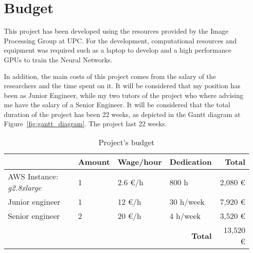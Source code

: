 \chapter{Budget}

This project has been developed using the resources provided by the Image Processing Group at UPC. For the development, computational resources and equipment was required such as a laptop to develop and a high performance GPUs to train the Neural Networks.

In addition, the main costs of this project comes from the salary of the researchers and the time spent on it. It will be considered that my position has been as Junior Engineer, while my two tutors of the project who where advising me have the salary of a Senior Engineer. It will be considered that the total duration of the project has been 22 weeks, as depicted in the Gantt diagram at Figure~\ref{fig:gantt_diagram}.
The project last 22 weeks.

\begin{table}[h]
\centering
\begin{tabular}{|l|l|l|l|r|}
\hline
 & \textbf{Amount} & \textbf{Wage/hour} & \textbf{Dedication} & \textbf{Total}  \\ [0.5ex]
\hline
AWS Instance: \textit{g2.8xlarge} & 1 & 2.6 \euro /h & 800 h & 2,080 \euro \\
\hline
Junior engineer & 1  & 12 \euro /h & 30 h/week & 7,920 \euro \\
\hline
Senior engineer & 2 & 20 \euro /h  & 4 h/week & 3,520 \euro \\
\hline
 \multicolumn{4}{|r|}{\textbf{Total}} & 13,520 \euro \\
\hline
\end{tabular}
\caption{Project's budget}
\end{table}
